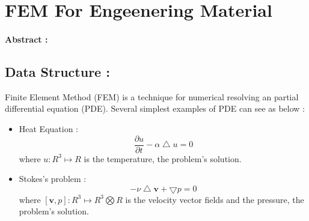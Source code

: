 \documentclass[a4paper,10pt]{article}
\begin{document}
\section{FEM For Engeenering Material}

\paragraph{Abstract : }

\subsection{Data Structure : }
Finite Element Method (FEM) is a technique for numerical resolving an partial differential equation (PDE). Several simplest examples of PDE can see as below : 
\begin{itemize}
 \item Heat Equation : \[ \frac{\partial u}{\partial t} - \alpha \bigtriangleup u = 0 \]
where $u : R^{3} \mapsto R $ is the temperature, the problem's solution.
 \item Stokes's problem :   \[ - \nu \bigtriangleup \textbf{v} + \bigtriangledown p = 0 \]
where $[\textbf{v},p] : R^{3} \mapsto R^{3}\bigotimes R $ is the velocity vector fields and the pressure, the problem's solution.
\end{itemize}
\end{document}
